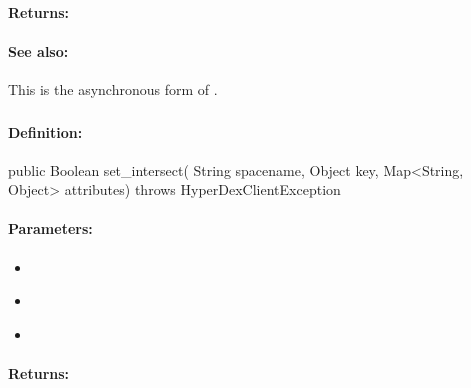 \paragraph{Returns:}


\paragraph{See also:}  This is the asynchronous form of .

\pagebreak
\subsubsection{}
\label{api:java:set_intersect}


\paragraph{Definition:}
\begin{javacode}
public Boolean set_intersect(
        String spacename,
        Object key,
        Map<String, Object> attributes) throws HyperDexClientException
\end{javacode}

\paragraph{Parameters:}
\begin{itemize}[noitemsep]
\item {}\\

\item {}\\

\item {}\\

\end{itemize}

\paragraph{Returns:}


